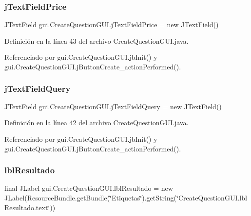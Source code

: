 \subsubsection{\texorpdfstring{jTextFieldPrice}{jTextFieldPrice}}
{\footnotesize\ttfamily J\+Text\+Field gui.\+Create\+Question\+G\+U\+I.\+j\+Text\+Field\+Price = new J\+Text\+Field()\hspace{0.3cm}{\ttfamily [private]}}



Definición en la línea 43 del archivo Create\+Question\+G\+U\+I.\+java.



Referenciado por gui.\+Create\+Question\+G\+U\+I.\+jb\+Init() y gui.\+Create\+Question\+G\+U\+I.\+j\+Button\+Create\+\_\+action\+Performed().

\mbox{\label{classgui_1_1CreateQuestionGUI_a5b8aa435d7a5e058ac6f9bd0706d523e}} 
\subsubsection{\texorpdfstring{jTextFieldQuery}{jTextFieldQuery}}
{\footnotesize\ttfamily J\+Text\+Field gui.\+Create\+Question\+G\+U\+I.\+j\+Text\+Field\+Query = new J\+Text\+Field()\hspace{0.3cm}{\ttfamily [private]}}



Definición en la línea 42 del archivo Create\+Question\+G\+U\+I.\+java.



Referenciado por gui.\+Create\+Question\+G\+U\+I.\+jb\+Init() y gui.\+Create\+Question\+G\+U\+I.\+j\+Button\+Create\+\_\+action\+Performed().

\mbox{\label{classgui_1_1CreateQuestionGUI_aa8b6309e7e7f51e35da8339e0170ca96}} 
\subsubsection{\texorpdfstring{lblResultado}{lblResultado}}
{\footnotesize\ttfamily final J\+Label gui.\+Create\+Question\+G\+U\+I.\+lbl\+Resultado = new J\+Label(Resource\+Bundle.\+get\+Bundle(\char`\"{}Etiquetas\char`\"{}).get\+String(\char`\"{}Create\+Question\+G\+U\+I.\+lbl\+Resultado.\+text\char`\"{}))\hspace{0.3cm}{\ttfamily [private]}}



